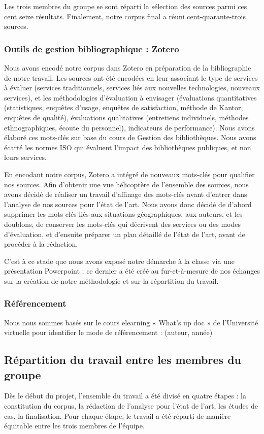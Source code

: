 \documentclass[french,a4paper,12pt]{article}
\begin{document}
Les trois membres du groupe se sont réparti la sélection des sources parmi ces cent seize résultats. Finalement, notre corpus final a réuni cent-quarante-trois sources.  \\

\subsubsection{ Outils de gestion bibliographique : Zotero}
\quad Nous avons encodé notre corpus dans Zotero en préparation de la bibliographie de notre travail. Les sources ont été encodées en leur associant le type de services à évaluer (services traditionnels, services liés aux nouvelles technologies, nouveaux services), et les méthodologies d'évaluation à envisager (évaluations quantitatives (statistiques, enquêtes d’usage, enquêtes de satisfaction, méthode de Kantor, enquêtes de qualité), évaluations qualitatives (entretiens individuels, méthodes ethnographiques, écoute du personnel), indicateurs de performance). Nous avons élaboré ces mots-clés sur base du cours de Gestion des bibliothèques. Nous avons écarté les normes ISO qui évaluent l'impact des bibliothèques publiques, et non leurs services. 

En encodant notre corpus, Zotero a intégré de nouveaux mots-clés pour qualifier nos sources. Afin d’obtenir une vue hélicoptère de l’ensemble des sources, nous avons décidé de réaliser un travail d’affinage des mots-clés avant d’entrer dans l’analyse de nos sources pour l’état de l’art. Nous avons donc décidé de d’abord supprimer les mots clés liés aux situations géographiques, aux auteurs, et les doublons, de conserver les mots-clés qui décrivent des services ou des modes d'évaluation, et d’ensuite préparer un plan détaillé de l’état de l’art, avant de procéder à la rédaction. 

C’est à ce stade que nous avons exposé notre démarche à la classe via une présentation Powerpoint ; ce dernier a été créé au fur-et-à-mesure de nos échanges sur la création de notre méthodologie et sur la répartition du travail. \\

\subsubsection{Référencement }
Nous nous sommes basés sur le cours elearning « What’s up doc » de l’Université virtuelle pour identifier le mode de référencement : (auteur, année)

\subsection{Répartition du travail entre les membres du groupe}
\quad Dès le début du projet, l’ensemble du travail a été divisé en quatre étapes : la constitution du corpus, la rédaction de l'analyse pour l’état de l’art, les études de cas, la finalisation. Pour chaque étape, le travail a été réparti de manière équitable entre les trois membres de l’équipe. \\
\end{document}
